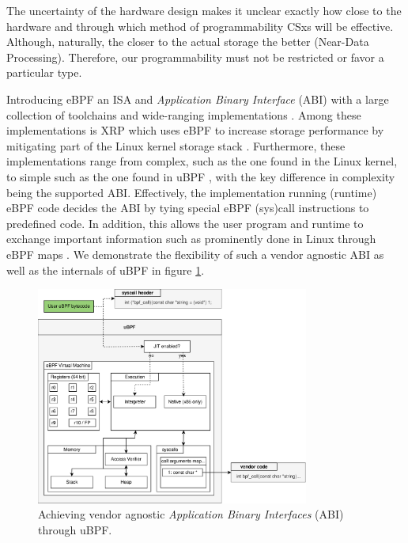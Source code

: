 The uncertainty of the hardware design makes it unclear exactly how close to the
hardware and through which method of programmability CSxs will be effective.
Although, naturally, the closer to the actual storage the better
(Near-Data Processing). Therefore, our programmability must not be restricted or
favor a particular type.

Introducing eBPF an ISA and \textit{Application Binary Interface} (ABI) with a
large collection of toolchains and wide-ranging implementations
\cite{what-ebpf, McCanne1993TheBP}. Among these implementations is XRP which
uses eBPF to increase storage performance by mitigating part of the Linux kernel
storage stack \cite{280870}. Furthermore, these implementations range from
complex, such as the one found in the Linux kernel, to simple such as the one
found in uBPF \cite{ubpf}, with the key difference in complexity being the
supported ABI. Effectively, the implementation running (runtime) eBPF code
decides the ABI by tying special eBPF (sys)call instructions to predefined code.
In addition, this allows the user program and runtime to exchange important
information such as prominently done in Linux through eBPF maps \cite{bpf-man}.
We demonstrate the flexibility of such a vendor agnostic ABI as well as the
internals of uBPF in figure \ref{figure:ubpf-abi}.

\begin{figure}
    \centering
	\includegraphics[width=0.8\textwidth]{resources/images/ubpf-abi.pdf}
	\caption{Achieving vendor agnostic \textit{Application Binary Interfaces}
        (ABI) through uBPF.}
    \label{figure:ubpf-abi}
\end{figure}

